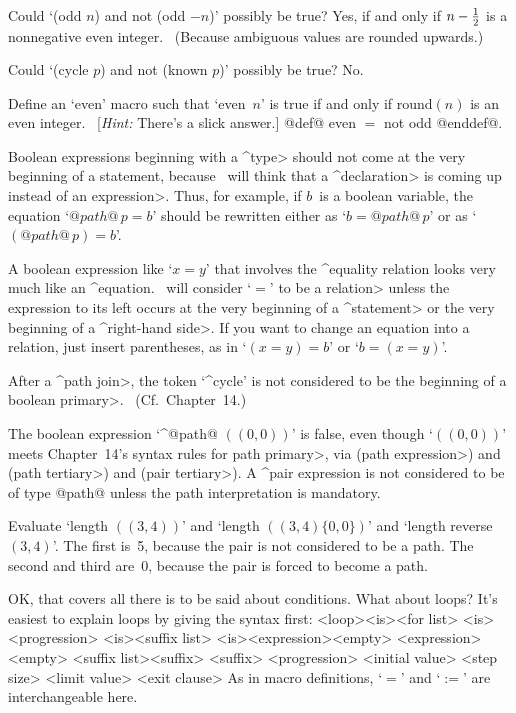 \dangerexercise Could `(odd $n$) and not (odd $-n$)' possibly be true?
\answer Yes, if and only if $n-{1\over2}$ is a nonnegative even integer.
\ (Because ambiguous values are rounded upwards.)

\dangerexercise Could `(cycle $p$) and not (known $p$)' possibly be true?
\answer No.

\dangerexercise Define an `even' macro such that `even~$n$' is true if
and only if round$(n)$ is an even integer. \ [{\sl Hint:\/} There's a
slick answer.]
\answer @def@ even $=$ not odd @enddef@.

\ddanger Boolean expressions beginning with a ^\<type> should not come
at the very beginning of a statement, because \MF\ will think that
a ^\<declaration> is coming up instead of an \<expression>. Thus, for
example, if $b$~is a boolean variable, the equation `$@path@\,p=b$'
should be rewritten either as `$b=@path@\,p$' or as `$(@path@\,p)=b$'.

\ddanger A boolean expression like `$x=y$' that involves the ^{equality}
relation looks very much like an ^{equation}. \MF\ will consider `$=$'
to be a \<relation> unless the expression to its left occurs at the
very beginning of a ^\<statement> or the very beginning of a ^\<right-hand
side>. If you want to change an equation into a relation,
just insert parentheses, as in `$(x=y)=b$' or `$b=(x=y)$'.

\ddanger After a ^\<path join>, the token `^{cycle}' is not considered
to be the beginning of a \<boolean primary>. \ (Cf.\ Chapter~14.)

\ddanger The boolean expression `^@path@ $((0,0))$' is false, even
though `$((0,0))$' meets Chapter~14's syntax rules for
\<path primary>, via (\<path expression>) and
(\<path tertiary>) and
(\<pair tertiary>). A ^{pair expression} is not considered to be
of type @path@ unless the path interpretation is mandatory.

\ddangerexercise Evaluate `length $((3,4))$' and `length $((3,4)\{0,0\})$'
and `length reverse~$(3,4)$'.
\answer The first is~5, because the pair is not considered to be a path.
The second and third are~0, because the pair is forced to become a path.

OK, that covers all there is to be said about conditions. What about
loops? It's easiest to explain loops by giving the syntax first:
\beginsyntax
<loop><is><for list>
 <is><progression>
 <is><suffix list>
 \alt[forever]
<is>\is[=]\is<expression>\alt<empty>
 \alt<for list>[,]<expression><empty>
<suffix list>\is<suffix>
 <suffix>
<progression>
<initial value>
<step size>
<limit value>
<exit clause>
\endsyntax
As in macro definitions, `$=$' and `$:=$' are interchangeable here.

